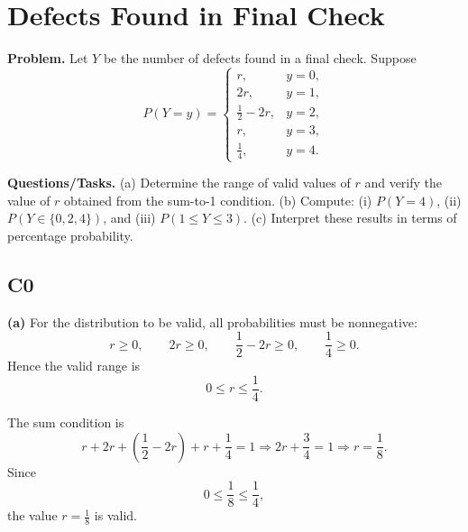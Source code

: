 		
		
		\section{Defects Found in Final Check}
		
			\textbf{Problem.}
		Let $Y$ be the number of defects found in a final check. Suppose
		\[
		P(Y=y)=\begin{cases}
			r, & y=0,\\
			2r, & y=1,\\
			\frac{1}{2}-2r, & y=2,\\
			r, & y=3,\\
			\frac{1}{4}, & y=4.
		\end{cases}
		\]
		
		\textbf{Questions/Tasks.}
		(a) Determine the range of valid values of $r$ and verify the value of $r$ obtained from the sum-to-1 condition.
		(b) Compute: (i) $P(Y=4)$, (ii) $P(Y\in\{0,2,4\})$, and (iii) $P(1\le Y\le 3)$.
		(c) Interpret these results in terms of percentage probability.
		
		\subsection*{C0}

		\textbf{(a)} For the distribution to be valid, all probabilities must be nonnegative:
		\[
		r\ge 0,\qquad 2r\ge 0,\qquad \frac{1}{2}-2r\ge 0,\qquad \frac{1}{4}\ge 0.
		\]
		Hence the valid range is
		\[
		0\le r\le \frac{1}{4}.
		\]
		
		The sum condition is
		\[
		r+2r+\left(\frac{1}{2}-2r\right)+r+\frac{1}{4}=1
		\Rightarrow 2r+\frac{3}{4}=1
		\Rightarrow r=\frac{1}{8}.
		\]
		Since
		\[
		0\le \frac{1}{8}\le \frac{1}{4},
		\]
		the value $r=\frac{1}{8}$ is valid.
		

